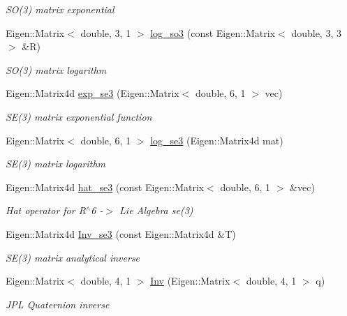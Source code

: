 \begin{DoxyCompactItemize}
\begin{DoxyCompactList}\small\item\em S\+O(3) matrix exponential \end{DoxyCompactList}\item 
Eigen\+::\+Matrix$<$ double, 3, 1 $>$ \hyperlink{namespaceov__core_a1bbbcb3ed59aa7dff7883c2e8644d9fb}{log\+\_\+so3} (const Eigen\+::\+Matrix$<$ double, 3, 3 $>$ \&R)
\begin{DoxyCompactList}\small\item\em S\+O(3) matrix logarithm \end{DoxyCompactList}\item 
Eigen\+::\+Matrix4d \hyperlink{namespaceov__core_a8907fdb4273f23741299fb23a1c1f572}{exp\+\_\+se3} (Eigen\+::\+Matrix$<$ double, 6, 1 $>$ vec)
\begin{DoxyCompactList}\small\item\em S\+E(3) matrix exponential function \end{DoxyCompactList}\item 
Eigen\+::\+Matrix$<$ double, 6, 1 $>$ \hyperlink{namespaceov__core_aaf3626f4ed6392b8b0b0d0a75ff08a61}{log\+\_\+se3} (Eigen\+::\+Matrix4d mat)
\begin{DoxyCompactList}\small\item\em S\+E(3) matrix logarithm \end{DoxyCompactList}\item 
Eigen\+::\+Matrix4d \hyperlink{namespaceov__core_a2854f4368bab599be2404f396f5ee434}{hat\+\_\+se3} (const Eigen\+::\+Matrix$<$ double, 6, 1 $>$ \&vec)
\begin{DoxyCompactList}\small\item\em Hat operator for R$^\wedge$6 -\/$>$ Lie Algebra se(3) \end{DoxyCompactList}\item 
Eigen\+::\+Matrix4d \hyperlink{namespaceov__core_aba0a3888c4f1998478719dc70597ac73}{Inv\+\_\+se3} (const Eigen\+::\+Matrix4d \&T)
\begin{DoxyCompactList}\small\item\em S\+E(3) matrix analytical inverse \end{DoxyCompactList}\item 
Eigen\+::\+Matrix$<$ double, 4, 1 $>$ \hyperlink{namespaceov__core_a3ebbc28aa8b0945da800771168f7c843}{Inv} (Eigen\+::\+Matrix$<$ double, 4, 1 $>$ q)
\begin{DoxyCompactList}\small\item\em J\+PL Quaternion inverse \end{DoxyCompactList}\item 

\end{DoxyCompactItemize}
